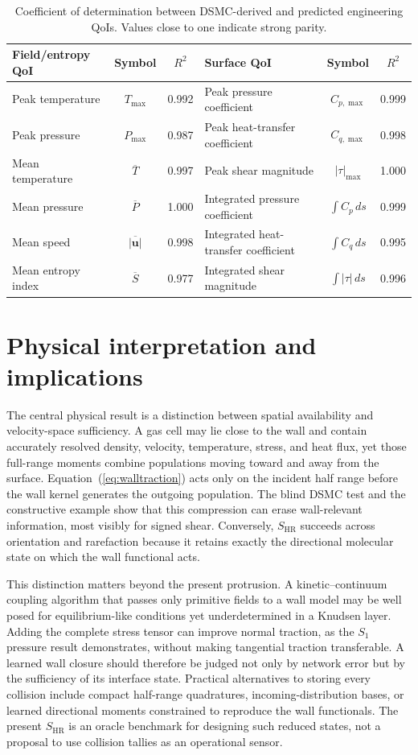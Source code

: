 \documentclass[aip,pof,preprint,notitlepage,floatfix,amsmath,amssymb]{revtex4-2}
\begin{document}
\begin{table}[t]
\centering
\caption{Coefficient of determination between DSMC-derived and predicted engineering QoIs. Values close to one indicate strong parity.}
\label{tab:qoi}
\begin{tabular}{lcc@{\qquad}lcc}
\toprule
Field/entropy QoI & Symbol & $R^2$ & Surface QoI & Symbol & $R^2$ \\
\midrule
Peak temperature & $T_{\max}$ & 0.992 & Peak pressure coefficient & $C_{p,\max}$ & 0.999 \\
Peak pressure & $P_{\max}$ & 0.987 & Peak heat-transfer coefficient & $C_{q,\max}$ & 0.998 \\
Mean temperature & $\overline{T}$ & 0.997 & Peak shear magnitude & $|\tau|_{\max}$ & 1.000 \\
Mean pressure & $\overline{P}$ & 1.000 & Integrated pressure coefficient & $\int C_p\,ds$ & 0.999 \\
Mean speed & $\overline{|\mathbf{u}|}$ & 0.998 & Integrated heat-transfer coefficient & $\int C_q\,ds$ & 0.995 \\
Mean entropy index & $\overline{S}$ & 0.977 & Integrated shear magnitude & $\int |\tau|\,ds$ & 0.996 \\

\bottomrule
\end{tabular}
\end{table}

\section{Physical interpretation and implications}
The central physical result is a distinction between spatial availability and velocity-space sufficiency. A gas cell may lie close to the wall and contain accurately resolved density, velocity, temperature, stress, and heat flux, yet those full-range moments combine populations moving toward and away from the surface. Equation~(\ref{eq:walltraction}) acts only on the incident half range before the wall kernel generates the outgoing population. The blind DSMC test and the constructive example show that this compression can erase wall-relevant information, most visibly for signed shear. Conversely, $S_{\mathrm{HR}}$ succeeds across orientation and rarefaction because it retains exactly the directional molecular state on which the wall functional acts.

This distinction matters beyond the present protrusion. A kinetic--continuum coupling algorithm that passes only primitive fields to a wall model may be well posed for equilibrium-like conditions yet underdetermined in a Knudsen layer. Adding the complete stress tensor can improve normal traction, as the $S_1$ pressure result demonstrates, without making tangential traction transferable. A learned wall closure should therefore be judged not only by network error but by the sufficiency of its interface state. Practical alternatives to storing every collision include compact half-range quadratures, incoming-distribution bases, or learned directional moments constrained to reproduce the wall functionals. The present $S_{\mathrm{HR}}$ is an oracle benchmark for designing such reduced states, not a proposal to use collision tallies as an operational sensor.
\end{document}
